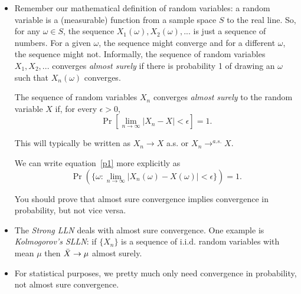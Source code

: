 \begin{itemize}[leftmargin=0pt]

\item Remember our mathematical definition of random variables: a
  random variable is a (measurable) function from a sample space $S$
  to the real line.  So, for any $\omega \in S$, the sequence $X_1(\omega),
  X_2(\omega),...$ is just a sequence of numbers.  For a given $\omega$, the
  sequence might converge and for a different $\omega$, the sequence might
  not.  Informally, the sequence of random variables $X_1,X_2,...$
  converges \emph{almost surely} if there is probability 1 of drawing
  an $\omega$ such that $X_n(\omega)$ converges.
  \begin{defn}
    The sequence of random variables $X_n$ converges \emph{almost
    surely} to the random variable $X$ if, for every $\epsilon > 0$,
    \begin{equation}\label{p1}
      \Pr[\lim_{n \to \infty} | X_n - X | < \epsilon] = 1.
    \end{equation}
  \end{defn}
  This will typically be written as $X_n \to X$ a.s. or $X_n \to^{a.s.}
  X$.

  We can write equation~\eqref{p1} more explicitly as
  \begin{equation*}
    \Pr(\{ \omega : \lim_{n \to \infty} | X_n(\omega) - X(\omega) |
           < \epsilon \}) = 1.
  \end{equation*}

  You should prove that almost sure convergence implies convergence in
  probability, but not vice versa.

\item The \emph{Strong LLN} deals with almost sure convergence.  One
  example is \emph{Kolmogorov's SLLN}: if $\{X_n\}$ is a sequence of
  i.i.d. random variables with mean $\mu$ then $\bar{X} \to \mu$ almost surely.

\item For statistical purposes, we pretty much only need convergence
  in probability, not almost sure convergence.

\end{itemize}


